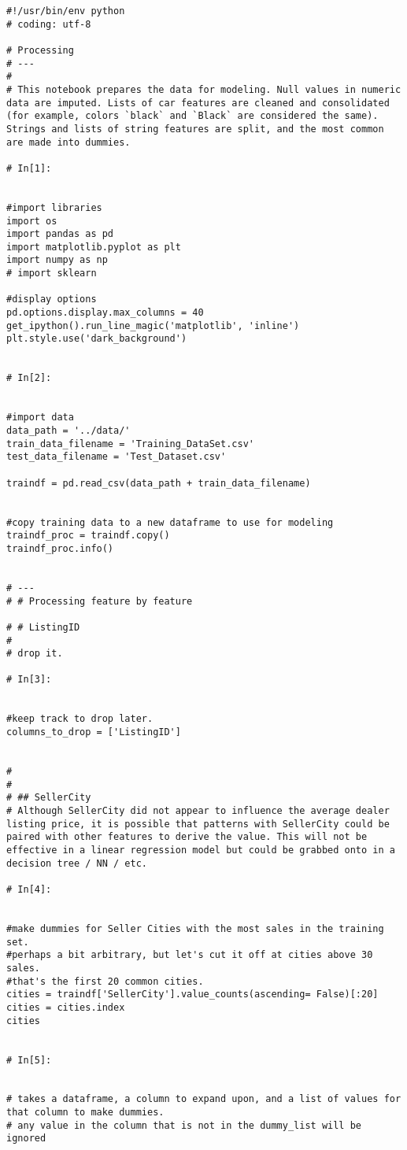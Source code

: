 \begin{verbatim}
#!/usr/bin/env python
# coding: utf-8

# Processing
# ---
# 
# This notebook prepares the data for modeling. Null values in numeric data are imputed. Lists of car features are cleaned and consolidated (for example, colors `black` and `Black` are considered the same). Strings and lists of string features are split, and the most common are made into dummies.

# In[1]:


#import libraries
import os
import pandas as pd
import matplotlib.pyplot as plt
import numpy as np
# import sklearn

#display options
pd.options.display.max_columns = 40
get_ipython().run_line_magic('matplotlib', 'inline')
plt.style.use('dark_background')


# In[2]:


#import data
data_path = '../data/'
train_data_filename = 'Training_DataSet.csv'
test_data_filename = 'Test_Dataset.csv'

traindf = pd.read_csv(data_path + train_data_filename)


#copy training data to a new dataframe to use for modeling
traindf_proc = traindf.copy()
traindf_proc.info()


# ---
# # Processing feature by feature

# # ListingID
# 
# drop it.

# In[3]:


#keep track to drop later.
columns_to_drop = ['ListingID']


# 
# 
# ## SellerCity
# Although SellerCity did not appear to influence the average dealer listing price, it is possible that patterns with SellerCity could be paired with other features to derive the value. This will not be effective in a linear regression model but could be grabbed onto in a decision tree / NN / etc.

# In[4]:


#make dummies for Seller Cities with the most sales in the training set.
#perhaps a bit arbitrary, but let's cut it off at cities above 30 sales.
#that's the first 20 common cities.
cities = traindf['SellerCity'].value_counts(ascending= False)[:20]
cities = cities.index
cities


# In[5]:


# takes a dataframe, a column to expand upon, and a list of values for that column to make dummies.
# any value in the column that is not in the dummy_list will be ignored


\end{verbatim}
